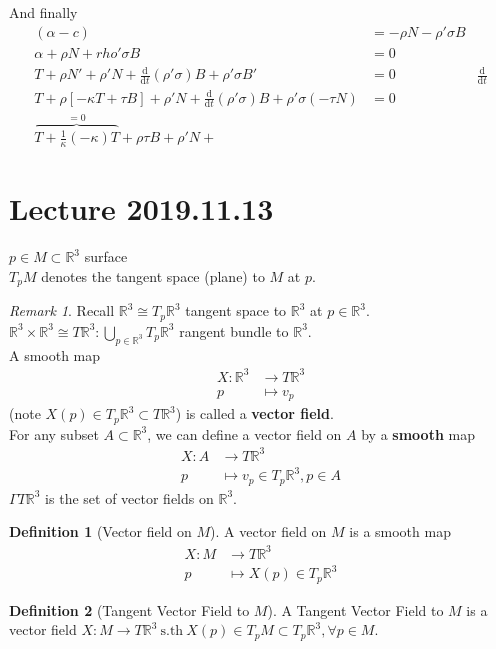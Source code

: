 \documentclass{article}
\newcommand{\sth}{\ \mathrm{s.th\ }}
\renewcommand{\d}{\mathrm{d}}
\newcommand{\R}{\mathbb{R}}
\newcommand{\dv}[2]{\frac{\d #1}{\d #2}}
\theoremstyle{definition}
\newtheorem{definition}{Definition}[section]
\theoremstyle{remark}
\theoremstyle{example}
\newtheorem*{remark}{Remark}
\begin{document}
	And finally \begin{align*}
		(\alpha - c)& = -\rho N - \rho' \sigma B\\
		\alpha + \rho N + rho' \sigma B &= 0\\
		T+\rho N' + \rho' N + \dv{}{t}(\rho' \sigma) B + \rho' \sigma B' &= 0 & \dv{}{t}\\
		T + \rho[-\kappa T + \tau B] + \rho' N + \dv{}{t}(\rho' \sigma) B + \rho' \sigma(- \tau N) & = 0\\
		\overbrace{T+\frac{1}{\kappa}\left(- \kappa \right) T}^{=0} + \rho \tau B + \rho'N+
	\end{align*}
	\pagebreak
	\section*{Lecture 2019.11.13}
	$p \in M \subset \R^3$ surface\\
	$T_pM$ denotes the tangent space (plane) to $M$ at $p$.\\
	\begin{remark}
		Recall $\R^3 \cong T_p\R^3$ tangent space to $\R^3$ at $p \in \R^3$.\\
		$\R^3 \times \R^3 \cong T\R^3: \bigcup_{p \in \R^3} T_p \R^3$ rangent bundle to $\R^3$.\\
		A smooth map \begin{align*}
			X:\R^3 & \to T\R^3\\
			p & \mapsto v_p
		\end{align*}
		(note $X(p) \in T_p\R^3 \subset T\R^3$)
		is called a \textbf{vector field}.\\
		For any subset $A \subset \R^3$, we can define a vector field on $A$ by a \textbf{smooth} map \begin{align*}
			X:A & \to  T\R^3\\
			p & \mapsto v_p \in T_p\R^3, p \in A
		\end{align*}
		$\Gamma T \R^3$ is the set of vector fields on $\R^3$.
	\end{remark}

	\begin{definition}[Vector field on $M$]
		A vector field on $M$ is a smooth map \begin{align*}
		X:M & \to T \R^3\\
		p & \mapsto X(p) \in T_p \R^3
		\end{align*}
	\end{definition}
	
	\begin{definition}[Tangent Vector Field to $M$]
		A Tangent Vector Field to $M$ is a vector field $X:M \to T\R^3 \sth X(p) \in T_pM \subset T_p\R^3, \forall p \in M$.
	\end{definition}
\end{document}
